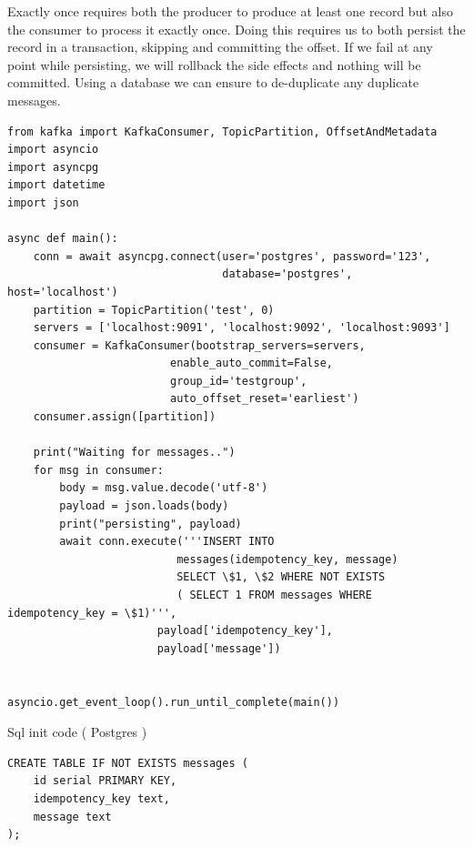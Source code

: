 \documentclass[11pt]{article}
\begin{document}
Exactly once requires both the producer to produce at least one record but also the consumer to process it exactly once.  Doing this requires us to both persist the record in a transaction, skipping and committing the offset. If we fail at any point while persisting, we will rollback the side effects and nothing will be committed. Using a database we can ensure to de-duplicate any duplicate messages.
\newline
\begin{adjustwidth}{-30pt}{0pt}
\begin{Verbatim}
from kafka import KafkaConsumer, TopicPartition, OffsetAndMetadata
import asyncio
import asyncpg
import datetime
import json

async def main():
    conn = await asyncpg.connect(user='postgres', password='123',
                                 database='postgres', host='localhost')
    partition = TopicPartition('test', 0)
    servers = ['localhost:9091', 'localhost:9092', 'localhost:9093']
    consumer = KafkaConsumer(bootstrap_servers=servers,
                         enable_auto_commit=False,
                         group_id='testgroup',
                         auto_offset_reset='earliest')
    consumer.assign([partition])

    print("Waiting for messages..")
    for msg in consumer:
        body = msg.value.decode('utf-8')
        payload = json.loads(body)
        print("persisting", payload)
        await conn.execute('''INSERT INTO 
        				  messages(idempotency_key, message)
                          SELECT \$1, \$2 WHERE NOT EXISTS
                          ( SELECT 1 FROM messages WHERE idempotency_key = \$1)''',
                       payload['idempotency_key'],
                       payload['message'])


asyncio.get_event_loop().run_until_complete(main())
\end{Verbatim}
\end{adjustwidth}


\clearpage
Sql init code ( Postgres )
\begin{adjustwidth}{-30pt}{0pt}
\begin{Verbatim}[frame=single]
CREATE TABLE IF NOT EXISTS messages (
    id serial PRIMARY KEY,
    idempotency_key text,
    message text
);
\end{Verbatim}
\end{adjustwidth}
\end{document}
